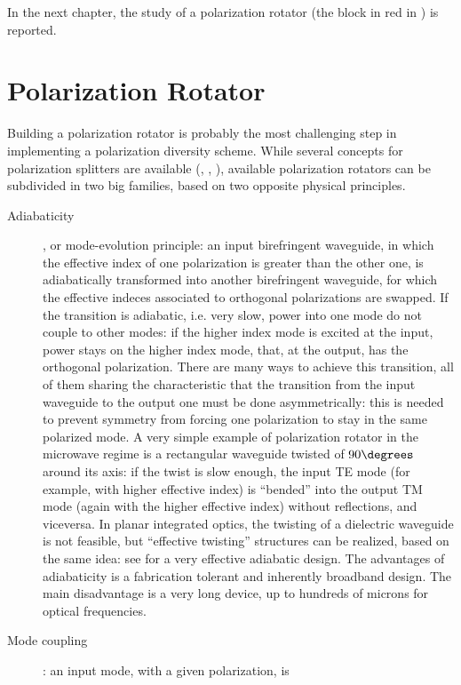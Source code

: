 In the next chapter, the study of a polarization rotator (the block in
red in ) is reported.

\chapter{Polarization Rotator} \label{sec:polrot}

Building a polarization rotator is probably the most challenging step
in implementing a polarization diversity scheme. While several concepts
for polarization splitters are available (\cite{kiyat_compact},
\cite{taillaert_compact}, \cite{wu_planar}), available polarization
rotators can be subdivided in two big families, based on two opposite
physical principles.
\begin{description}
\item[Adiabaticity], or mode-evolution principle: an input
  birefringent waveguide, in which the effective index of one
  polarization is greater than the other one, is adiabatically
  transformed into another birefringent waveguide, for which the
  effective indeces associated to orthogonal polarizations are
  swapped. If the transition is adiabatic, i.e. very slow, power into
  one mode do not couple to other modes: if the higher index mode is
  excited at the input, power stays on the higher index mode, that, at
  the output, has the orthogonal polarization. There are many ways to
  achieve this transition, all of them sharing the characteristic that
  the transition from the input waveguide to the output one must be
  done asymmetrically: this is needed to prevent symmetry from forcing
  one polarization to stay in the same polarized mode. A very simple
  example of polarization rotator in the microwave regime is a
  rectangular waveguide twisted of $90\degrees$ around its axis: if
  the twist is slow enough, the input TE mode (for example, with
  higher effective index) is ``bended'' into the output TM mode
  (again with the higher effective index) without reflections, and
  viceversa. In planar integrated optics, the twisting of a dielectric
  waveguide is not feasible, but ``effective twisting'' structures can
  be realized, based on the same idea: see \cite{watts_integrated} for
  a very effective adiabatic design. The advantages of adiabaticity is
  a fabrication tolerant and inherently broadband design. The
  main disadvantage is a very long device, up to hundreds of microns
  for optical frequencies.
\item[Mode coupling]: an input mode, with a given polarization, is

\end{description}
